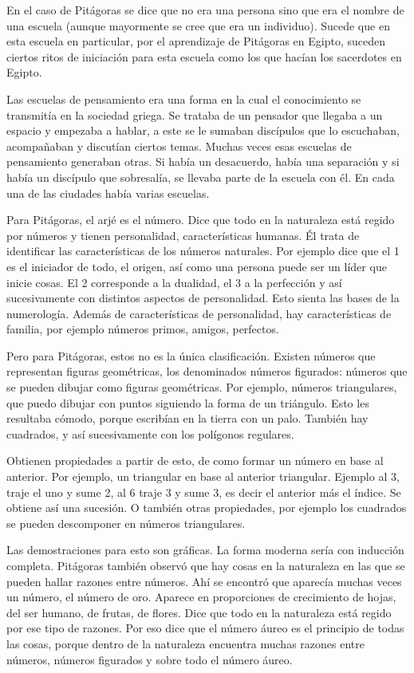 En el caso de Pitágoras se dice que no era una persona sino que era el nombre de una escuela (aunque mayormente se cree que era un individuo). Sucede que en esta escuela en particular, por el aprendizaje de Pitágoras en Egipto, suceden ciertos ritos de iniciación para esta escuela como los que hacían los sacerdotes en Egipto.

Las escuelas de pensamiento era una forma en la cual el conocimiento se transmitía en la sociedad griega. Se trataba de un pensador que llegaba a un espacio y empezaba a hablar, a este se le sumaban discípulos que lo escuchaban, acompañaban y discutían ciertos temas. Muchas veces esas escuelas de pensamiento generaban otras. Si había un desacuerdo, había una separación y si había un discípulo que sobresalía, se llevaba parte de la escuela con él. En cada una de las ciudades había varias escuelas. 

Para Pitágoras, el arjé es el número. Dice que todo en la naturaleza está regido por números y tienen personalidad, características humanas. Él trata de identificar las características de los números naturales. Por ejemplo dice que el 1 es el iniciador de todo, el origen, así como una persona puede ser un líder que inicie cosas. El 2 corresponde a la dualidad, el 3 a la perfección y así sucesivamente con distintos aspectos de personalidad. Esto sienta las bases de la numerología. Además de características de personalidad, hay características de familia, por ejemplo números primos, amigos, perfectos.

Pero para Pitágoras, estos no es la única clasificación. Existen números que representan figuras geométricas, los denominados números figurados: números que se pueden dibujar como figuras geométricas. Por ejemplo, números triangulares, que puedo dibujar con puntos siguiendo la forma de un triángulo. Esto les resultaba cómodo, porque escribían en la tierra con un palo. También hay cuadrados, y así sucesivamente con los polígonos regulares. 

Obtienen propiedades a partir de esto, de como formar un número en base al anterior. Por ejemplo, un triangular en base al anterior triangular. Ejemplo al 3, traje el uno y sume 2, al 6 traje 3 y sume 3, es decir el anterior más el índice. Se obtiene así una sucesión. O también otras propiedades, por ejemplo los cuadrados se pueden descomponer en números triangulares. 

Las demostraciones para esto son gráficas. La forma moderna sería con inducción completa. Pitágoras también observó que hay cosas en la naturaleza en las que se pueden hallar razones entre números. Ahí se encontró que aparecía muchas veces un número, el número de oro. Aparece en proporciones de crecimiento de hojas, del ser humano, de frutas, de flores. Dice que todo en la naturaleza está regido por ese tipo de razones. Por eso dice que el número áureo es el principio de todas las cosas, porque dentro de la naturaleza encuentra muchas razones entre números, números figurados y sobre todo el número áureo. 

